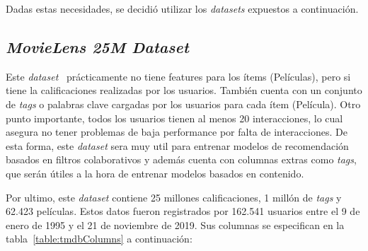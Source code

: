 \documentclass[11pt,a4paper,twoside]{thesis}
\begin{document}
Dadas estas necesidades, se decidió utilizar los \textit{datasets} expuestos a
continuación.

\subsection{\textit{MovieLens 25M Dataset}}

Este \textit{dataset}~\cite{movielens} prácticamente no tiene features para los
ítems (Películas), pero si tiene la calificaciones realizadas por los usuarios.
También cuenta con un conjunto de \textit{tags} o palabras clave cargadas por
los usuarios para cada ítem (Película). Otro punto importante, todos los
usuarios tienen al menos 20 interacciones, lo cual asegura no tener problemas
de baja performance por falta de interacciones. De esta forma, este
\textit{dataset} sera muy util para entrenar modelos de recomendación basados
en filtros colaborativos y además cuenta con columnas extras como
\textit{tags}, que serán útiles a la hora de entrenar modelos basados en
contenido.

Por ultimo, este \textit{dataset} contiene 25 millones calificaciones, 1 millón
de \textit{tags} y 62.423 películas. Estos datos fueron registrados por 162.541
usuarios entre el 9 de enero de 1995 y el 21 de noviembre de 2019. Sus columnas
se especifican en la tabla~\ref{table:tmdbColumns} a continuación:
\end{document}

